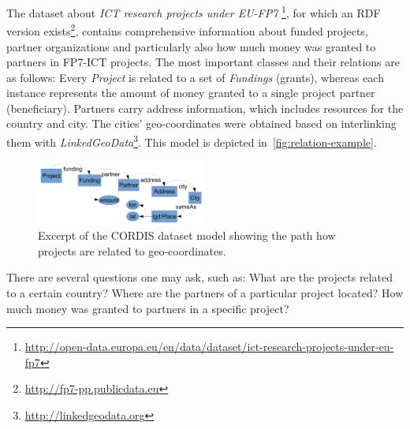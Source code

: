 The dataset about \emph{ICT research projects under EU-FP7} 
\footnote{\url{http://open-data.europa.eu/en/data/dataset/ict-research-projects-under-eu-fp7}},
for which an RDF version
exists\footnote{\url{http://fp7-pp.publicdata.eu}}, 
contains comprehensive information about funded projects, partner organizations and particularly also how much money was granted to partners in FP7-ICT
projects.
The most important classes and their relations are as follows:
Every \emph{Project} is related to a set of \emph{Fundings} (grants), whereas each
instance represents the amount of money granted to a single project
partner (beneficiary). %
Partners carry address information, which includes resources for
the country and city. The cities' geo-coordinates were
obtained based on interlinking them with
\emph{LinkedGeoData}\footnote{\url{http://linkedgeodata.org}}.
This model is depicted in~\autoref{fig:relation-example}.
\begin{figure}
\centering
\includegraphics[width=0.5\textwidth]{images/RelationExample}
\caption{Excerpt of the CORDIS dataset model showing the path how projects are related to geo-coordinates.}
\label{fig:relation-example}
\end{figure}

There are several questions one may ask, such as:
What are the projects related to a certain country? 
Where are the partners of a particular project located?
How much money was granted to partners in a specific project?

